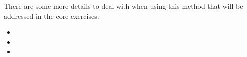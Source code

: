 There are some more details to deal with when using this method that will be addressed in the core exercises.




\begin{video}
\begin{itemize}
	\item {}
	\item {}
	\item {}
\end{itemize}	
\end{video}




